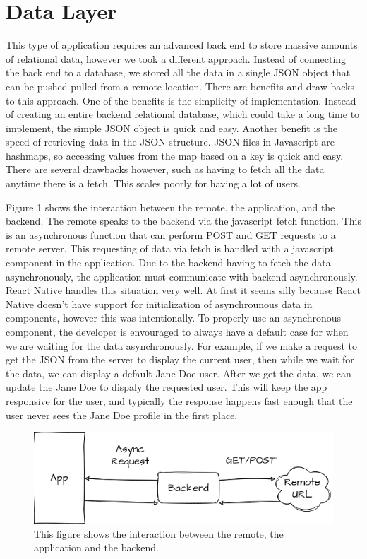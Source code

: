 \documentclass{article}
\begin{document}
	\newpage

	\section{Data Layer}
	This type of application requires an advanced back end to store massive amounts of relational
	data, however we took a different approach. Instead of connecting the back end to a database,
	we stored all the data in a single JSON object that can be pushed pulled from a remote 
	location. There are benefits and draw backs to this approach. One of the benefits is
	the simplicity of implementation. Instead of creating an entire backend relational database,
	which could take a long time to implement, the simple JSON object is quick and easy. Another 
	benefit is the speed of retrieving data in the JSON structure. JSON files in Javascript are 
	hashmaps, so accessing values from the map based on a key is quick and easy. 
	There are several drawbacks however, such as having to fetch all the data anytime there is a fetch.
	This scales poorly for having a lot of users. 

	Figure 1 shows the interaction between the remote, the application, and the backend. 
	The remote speaks to the backend via the javascript fetch function. This is an asynchronous
	function that can perform POST and GET requests to a remote server. This requesting of data via
	fetch is handled with a javascript component in the application. 
	Due to the backend having to fetch the data asynchronously, the application must communicate with
	backend asynchronously. React Native handles this situation very well. At first it seems silly
	because React Native doesn't have support for initialization of asynchrounous data in components, 
	however this was intentionally. To properly use an asynchronous component, the developer is envouraged
	to always have a default case for when we are waiting for the data asynchronously. For example, if
	we make a request to get the JSON from the server to display the current user, then while we wait 
	for the data, we can display a default Jane Doe user. After we get the data, we can update the Jane 
	Doe to dispaly the requested user. This will keep the app responsive for the user, and typically
	the response happens fast enough that the user never sees the Jane Doe profile in the first place. 



	\begin{figure}[b]
		\centering
		\includegraphics[width=1\textwidth]{remote.png}
		\caption{This figure shows the interaction between the remote, the application and the
		backend.}
	\end{figure}
\end{document}
